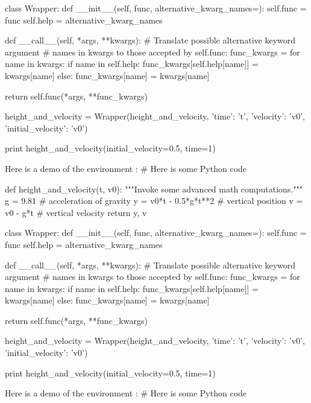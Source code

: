 class Wrapper:
    def __init__(self, func, alternative_kwarg_names={}):
        self.func = func
        self.help = alternative_kwarg_names

    def __call__(self, *args, **kwargs):
        # Translate possible alternative keyword argument
        # names in kwargs to those accepted by self.func:
        func_kwargs = {}
        for name in kwargs:
            if name in self.help:
                func_kwargs[self.help[name]] = kwargs[name]
            else:
                func_kwargs[name] = kwargs[name]

        return self.func(*args, **func_kwargs)

height_and_velocity = Wrapper(height_and_velocity,
                              {'time': 't',
                               'velocity': 'v0',
                               'initial_velocity': 'v0'})

print height_and_velocity(initial_velocity=0.5, time=1)


\noindent
Here is a demo of the environment :
# Here is some Python code

def height_and_velocity(t, v0):
    """Invoke some advanced math computations."""
    g = 9.81                  # acceleration of gravity
    y = v0*t - 0.5*g*t**2     # vertical position
    v = v0 - g*t              # vertical velocity
    return y, v

class Wrapper:
    def __init__(self, func, alternative_kwarg_names={}):
        self.func = func
        self.help = alternative_kwarg_names

    def __call__(self, *args, **kwargs):
        # Translate possible alternative keyword argument
        # names in kwargs to those accepted by self.func:
        func_kwargs = {}
        for name in kwargs:
            if name in self.help:
                func_kwargs[self.help[name]] = kwargs[name]
            else:
                func_kwargs[name] = kwargs[name]

        return self.func(*args, **func_kwargs)

height_and_velocity = Wrapper(height_and_velocity,
                              {'time': 't',
                               'velocity': 'v0',
                               'initial_velocity': 'v0'})

print height_and_velocity(initial_velocity=0.5, time=1)


\noindent
Here is a demo of the environment :
# Here is some Python code

